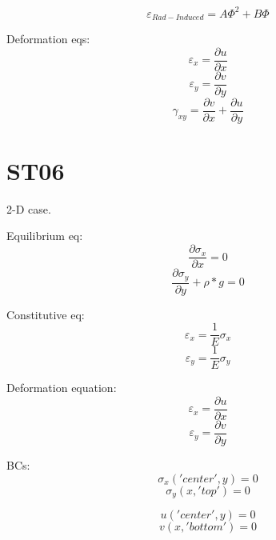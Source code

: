\documentclass[11pt,letterpaper]{article}
\begin{document}
\begin{equation}
\varepsilon_{Rad-Induced} = A \Phi^2 + B \Phi
\end{equation}

Deformation eqs:
\begin{equation}
\varepsilon_x = \frac{\partial u}{\partial x}
\end{equation}
\begin{equation}
\varepsilon_y = \frac{\partial v}{\partial y}
\end{equation}
\begin{equation}
\gamma_{xy} = \frac{\partial v}{\partial x} + \frac{\partial u}{\partial y}
\end{equation}

\section{ST06}

2-D case.

Equilibrium eq:
\begin{equation}
\frac{\partial \sigma_x}{\partial x} = 0
\end{equation}
\begin{equation}
\frac{\partial \sigma_y}{\partial y} + \rho * g = 0
\end{equation}

Constitutive eq:
\begin{equation}
\varepsilon_x = \frac{1}{E} \sigma_x
\end{equation}
\begin{equation}
\varepsilon_y = \frac{1}{E} \sigma_y
\end{equation}

Deformation equation:
\begin{equation}
\varepsilon_x = \frac{\partial u}{\partial x}
\end{equation}
\begin{equation}
\varepsilon_y = \frac{\partial v}{\partial y}
\end{equation}

BCs:
\begin{equation}
\sigma_x ('center', y) = 0
\end{equation}
\begin{equation}
\sigma_y (x, 'top') = 0
\end{equation}

\begin{equation}
u ('center', y) = 0
\end{equation}
\begin{equation}
v (x, 'bottom') = 0
\end{equation}
\end{document}
